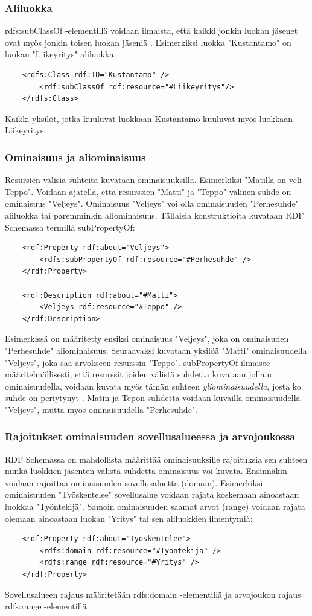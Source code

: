 \documentclass[finnish]{tktltiki2}
\theoremstyle{definition}
\theoremstyle{remark}
\begin{document}
\subsubsection{Aliluokka}
rdfs:subClassOf -elementillä voidaan ilmaista, että kaikki jonkin luokan jäsenet ovat myös jonkin toisen luokan jäseniä \cite{RDFS}. Esimerkiksi 
luokka "Kustantamo" on luokan "Liikeyritys" aliluokka:
\begin{verbatim}
    <rdfs:Class rdf:ID="Kustantamo" />
        <rdf:subClassOf rdf:resource="#Liikeyritys"/>
    </rdfs:Class>
\end{verbatim}
Kaikki yksilöt, jotka kuuluvat luokkaan Kustantamo kuuluvat myös luokkaan Liikeyritys.

\subsubsection{Ominaisuus ja aliominaisuus}

Resursien välisiä suhteita kuvataan ominaisuuksilla. Esimerkiksi "Matilla on veli Teppo". Voidaan ajatella, että resurssien "Matti" ja "Teppo" välinen suhde on ominaisuus "Veljeys". Ominaisuus "Veljeys" voi olla ominaisuuden "Perhesuhde"  aliluokka tai paremminkin aliominaisuus. Tällaisia konstruktioita kuvataan RDF Schemassa termillä subPropertyOf: 
\begin{verbatim}
    <rdf:Property rdf:about="Veljeys">
        <rdfs:subPropertyOf rdf:resource="#Perhesuhde" />
    </rdf:Property>

    <rdf:Description rdf:about="#Matti">
        <Veljeys rdf:resource="#Teppo" />
    </rdf:Description>
\end{verbatim}
Esimerkissä on määritetty ensiksi ominaisuus "Veljeys", joka on ominaisuden "Perhesuhde" aliominaisuus. Seuraavaksi kuvataan yksilöä "Matti" ominaisuudella "Veljeys", joka saa arvokseen resurssin "Teppo". subPropertyOf ilmaisee määritelmällisesti, että resurssit joiden välistä suhdetta kuvataan jollain ominaisuudella, voidaan kuvata myös tämän suhteen \textit{yliominaisuudella}, josta ko. suhde on periytynyt \cite{RDFS}. Matin ja Tepon suhdetta voidaan kuvailla ominaisuudella "Veljeys", mutta myös ominaisuudella "Perhesuhde". 

\subsubsection{Rajoitukset ominaisuuden sovellusalueessa ja arvojoukossa}
RDF Schemassa on mahdollista määrittää ominaisuuksille rajoituksia sen suhteen minkä luokkien jäsenten välistä suhdetta ominaisuus voi kuvata. Ensinnäkin
voidaan rajoittaa ominaisuuden sovellusaluetta (domain). Esimerkiksi ominaisuuden "Työskentelee" sovellusalue voidaan rajata koskemaan ainoastaan luokkaa "Työntekijä". Samoin 
ominaisuuden saamat arvot (range) voidaan rajata olemaan ainoastaan luokan "Yritys" tai sen aliluokkien ilmentymiä: 
\begin{verbatim}
    <rdf:Property rdf:about="Tyoskentelee">
        <rdfs:domain rdf:resource="#Tyontekija" />
        <rdfs:range rdf:resource="#Yritys" />
    </rdf:Property>
\end{verbatim}
Sovellusalueen rajaus määritetään rdfs:domain -elementillä ja arvojoukon rajaus rdfs:range -elementillä.  
\end{document}
